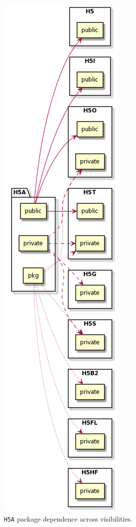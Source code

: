 \begin{figure}[!ht]
  \centering
  \includegraphics[scale=0.55]{images/H5A-dependence.png}
  \caption{\texttt{H5A} package dependence across visibilities.}
  \label{fig:h5a-dep}
\end{figure}

